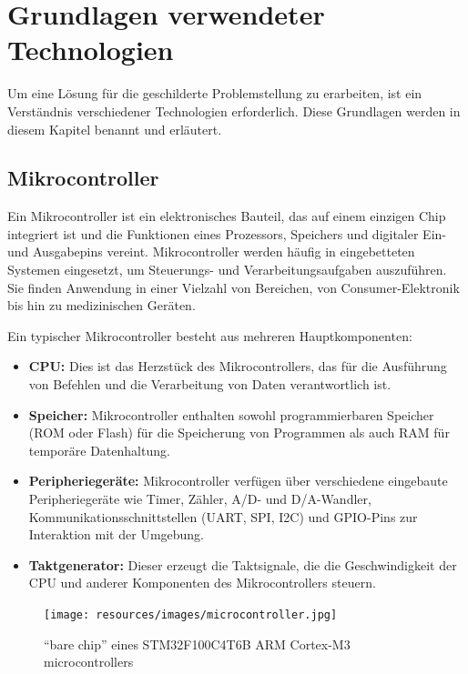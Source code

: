 

\chapter{Grundlagen verwendeter Technologien}
Um eine Lösung für die geschilderte Problemstellung zu erarbeiten, ist ein
Verständnis verschiedener Technologien erforderlich. Diese Grundlagen werden in diesem Kapitel benannt
und erläutert.


\section{Mikrocontroller}
Ein Mikrocontroller ist ein elektronisches Bauteil, das auf einem einzigen Chip integriert ist und die Funktionen
eines Prozessors, Speichers und digitaler Ein- und Ausgabepins vereint. Mikrocontroller werden häufig in eingebetteten
Systemen eingesetzt, um Steuerungs- und Verarbeitungsaufgaben auszuführen. Sie finden Anwendung in einer Vielzahl von
Bereichen, von Consumer-Elektronik bis hin zu medizinischen Geräten.

Ein typischer Mikrocontroller besteht aus mehreren Hauptkomponenten:
\begin{itemize}
    \item \textbf{\ac{CPU}:} Dies ist das Herzstück des Mikrocontrollers, das für die
          Ausführung von Befehlen und die Verarbeitung von Daten verantwortlich ist.
    \item \textbf{Speicher:} Mikrocontroller enthalten sowohl programmierbaren Speicher (\ac{ROM} oder Flash) für die
          Speicherung von Programmen als auch \ac{RAM} für temporäre Datenhaltung.
    \item \textbf{Peripheriegeräte:} Mikrocontroller verfügen über verschiedene eingebaute Peripheriegeräte wie Timer,
          Zähler, A/D- und D/A-Wandler, Kommunikationsschnittstellen (\ac{UART}, \ac{SPI}, \ac{I2C}) und \ac{GPIO}-Pins
          zur Interaktion mit der Umgebung.
    \item \textbf{Taktgenerator:} Dieser erzeugt die Taktsignale, die die Geschwindigkeit der \ac{CPU} und anderer
          Komponenten des Mikrocontrollers steuern.
\end{itemize}

\begin{figure}[H]
    \centering
    \texttt{[image: resources/images/microcontroller.jpg]}
    \caption[Mikrocontroller]{\enquote{bare chip} eines STM32F100C4T6B ARM Cortex-M3 microcontrollers\cite{microcontroller}}
    \label{fig:Microcontroller}
\end{figure}

